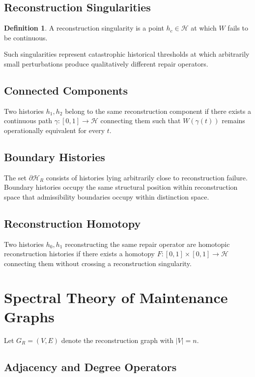\documentclass[12pt,oneside]{article}
\theoremstyle{plain}
\theoremstyle{definition}
\newtheorem{definition}[theorem]{Definition}
\theoremstyle{remark}
\theoremstyle{plain}
\newcommand{\Hist}{\mathcal{H}}
\begin{document}
\subsection{Reconstruction Singularities}

\begin{definition}
A reconstruction singularity is a point $h_c \in \Hist$ at which $W$ fails to be continuous.
\end{definition}

Such singularities represent catastrophic historical thresholds at which arbitrarily small
perturbations produce qualitatively different repair operators.

\subsection{Connected Components}

Two histories $h_1, h_2$ belong to the same reconstruction component if there exists a continuous
path $\gamma : [0,1] \rightarrow \Hist$ connecting them such that $W(\gamma(t))$ remains
operationally equivalent for every $t$.

\subsection{Boundary Histories}

The set $\partial \Hist_R$ consists of histories lying arbitrarily close to reconstruction failure.
Boundary histories occupy the same structural position within reconstruction space that
admissibility boundaries occupy within distinction space.

\subsection{Reconstruction Homotopy}

Two histories $h_0, h_1$ reconstructing the same repair operator are homotopic reconstruction
histories if there exists a homotopy $F : [0,1] \times [0,1] \rightarrow \Hist$ connecting them
without crossing a reconstruction singularity.

\section{Spectral Theory of Maintenance Graphs}

Let $G_R = (V, E)$ denote the reconstruction graph with $|V| = n$.

\subsection{Adjacency and Degree Operators}
\end{document}
